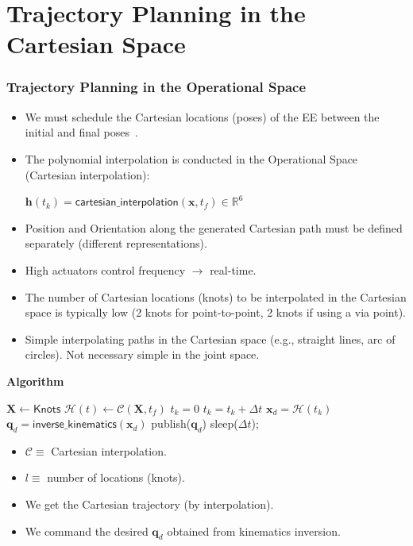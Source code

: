 \documentclass[10pt, aspectratio=169]{beamer}
\theoremstyle{remark}
\theoremstyle{definition}
\begin{document}
\section{Trajectory Planning in the Cartesian Space}
\begin{frame}[allowframebreaks]
\frametitle{Trajectory Planning in the Operational Space}

\begin{itemize}
    \item We must schedule the Cartesian locations (poses) of the EE between the initial and final poses~\cite{cartesian_trajectory_planning}.
    \item The polynomial interpolation is conducted in the Operational Space (Cartesian interpolation):
    
    $
    \mathbf{h}(t_k) = \textsf{cartesian\_interpolation}(\mathbf{x}, t_f)\in\mathbb{R}^6
    $
    
    \item Position and Orientation along the generated Cartesian path must be defined separately (different representations).
    \item High actuators control frequency $\rightarrow$ real-time.
    \item The number of Cartesian locations (knots) to be interpolated in the Cartesian space is typically low (2 knots for point-to-point, 2 knots if using a via point).
    \item Simple interpolating paths in the Cartesian space (e.g., straight lines, arc of circles). Not necessary simple in the joint space.
\end{itemize}

\framebreak

\textbf{\textcolor{uma_blue_dark}{Algorithm}}

\begin{minipage}[T!]{.47\linewidth}
\begin{algorithm}[H]
	$\mathbf{X} \gets \textsf{Knots}$\;
    $\mathcal{H}(t) \gets \mathcal{C}(\mathbf{X}, t_f)$\;
    $t_k = 0$\;
 	{
        $t_k = t_k + \Delta t$\;
        $\mathbf{x}_d = \mathcal{H}(t_k)$\;
        $\mathbf{q}_{d} =  \textsf{inverse\_kinematics}(\mathbf{x}_d)$\;
        publish($\mathbf{q}_{d}$)\;
        sleep($\Delta t$);
  	}
\end{algorithm}
\end{minipage}
\begin{minipage}[T!]{.42\linewidth}
\begin{itemize}
    \item $\mathcal{C}\equiv$ Cartesian interpolation.
    \item $l \equiv$ number of locations (knots).
    \item We get the Cartesian trajectory (by interpolation).
    \item We command the desired $\mathbf{q}_{d}$ obtained from kinematics inversion.
\end{itemize}
\end{minipage}
\end{frame}
\end{document}
